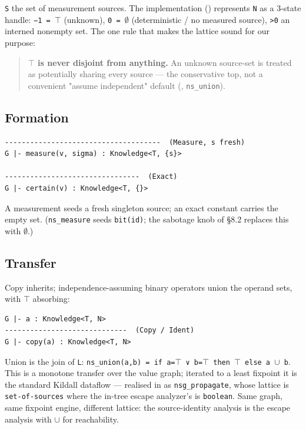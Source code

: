 \documentclass[sigplan,review,anonymous,10pt]{acmart}
\begin{document}
\texttt{S} the set of measurement sources. The implementation () represents \texttt{N} as a 3-state handle: \texttt{−1 = $\top$} (unknown), \texttt{0 = $\emptyset$} (deterministic / no measured source), \texttt{>0} an interned nonempty set. The one rule that makes the lattice sound for our purpose:

\begin{quote}
\textbf{\texttt{$\top$} is never disjoint from anything.} An unknown source-set is treated as potentially sharing every source --- the conservative top, not a convenient "assume independent" default (, \texttt{ns\_union}).
\end{quote}

\subsection{Formation}

\begin{lstlisting}
-------------------------------------  (Measure, s fresh)
G |- measure(v, sigma) : Knowledge<T, {s}>

--------------------------------  (Exact)
G |- certain(v) : Knowledge<T, {}>
\end{lstlisting}

A measurement seeds a fresh singleton source; an exact constant carries the empty set. (\texttt{ns\_measure} seeds \texttt{bit(id)}; the sabotage knob of §8.2 replaces this with \texttt{$\emptyset$}.)

\subsection{Transfer}

Copy inherits; independence-assuming binary operators union the operand sets, with \texttt{$\top$} absorbing:

\begin{lstlisting}
G |- a : Knowledge<T, N>
-----------------------------  (Copy / Ident)
G |- copy(a) : Knowledge<T, N>
\end{lstlisting}

Union is the join of \texttt{L}: \texttt{ns\_union(a,b) = if a=$\top$ ∨ b=$\top$ then $\top$ else a $\cup$ b}. This is a monotone transfer over the value graph; iterated to a least fixpoint it is the standard Kildall dataflow --- realised in  as \texttt{nsg\_propagate}, whose lattice is \texttt{set-of-sources} where the in-tree escape analyzer's is \texttt{boolean}. Same graph, same fixpoint engine, different lattice: the source-identity analysis is the escape analysis with \texttt{$\cup$} for reachability.
\end{document}
